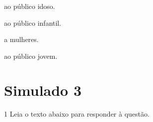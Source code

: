 \begin{escolha}

    \item ao público idoso.

    \item ao público infantil.

    \item a mulheres.

    \item ao público jovem.

\end{escolha}





\pagebreak

\section*{Simulado 3}

\num{1} Leia o texto abaixo para responder à questão. 

